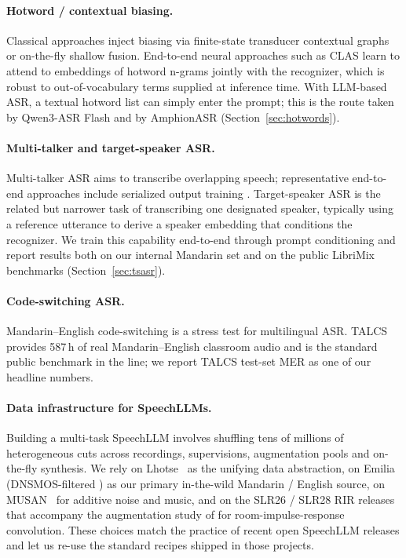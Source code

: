 \paragraph{Hotword / contextual biasing.}
Classical approaches inject biasing via finite-state transducer
contextual graphs or on-the-fly shallow fusion. End-to-end neural
approaches such as CLAS \cite{pundak2018deep} learn to attend to
embeddings of hotword n-grams jointly with the recognizer, which is
robust to out-of-vocabulary terms supplied at inference time. With
LLM-based ASR, a textual hotword list can simply enter the prompt; this
is the route taken by Qwen3-ASR Flash \cite{qwen2025qwen3asr} and by
AmphionASR (Section~\ref{sec:hotwords}).

\paragraph{Multi-talker and target-speaker ASR.}
Multi-talker ASR aims to transcribe overlapping speech; representative
end-to-end approaches include serialized output training
\cite{kanda2020serialized}. Target-speaker ASR is the related but
narrower task of transcribing one designated speaker, typically using a
reference utterance to derive a speaker embedding that conditions the
recognizer. We train this capability end-to-end through prompt
conditioning and report results both on our internal Mandarin set and
on the public LibriMix benchmarks \cite{cosentino2020librimix}
(Section~\ref{sec:tsasr}).

\paragraph{Code-switching ASR.}
Mandarin--English code-switching is a stress test for multilingual ASR.
TALCS \cite{li2022talcs} provides 587\,h of real Mandarin--English
classroom audio and is the standard public benchmark in the line; we
report TALCS test-set MER as one of our headline numbers.

\paragraph{Data infrastructure for SpeechLLMs.}
Building a multi-task SpeechLLM involves shuffling tens of millions of
heterogeneous cuts across recordings, supervisions, augmentation
pools and on-the-fly synthesis. We rely on
Lhotse~\cite{zelasko2021lhotse} as the unifying data abstraction, on
Emilia~\cite{he2024emilia} (DNSMOS-filtered \cite{reddy2021dnsmos}) as
our primary in-the-wild Mandarin / English source, on
MUSAN~\cite{snyder2015musan} for additive noise and music, and on the
SLR26 / SLR28 RIR releases that accompany the augmentation study of
\cite{ko2017studyrir} for room-impulse-response convolution. These
choices match the practice of recent open SpeechLLM releases and let
us re-use the standard recipes shipped in those projects.

